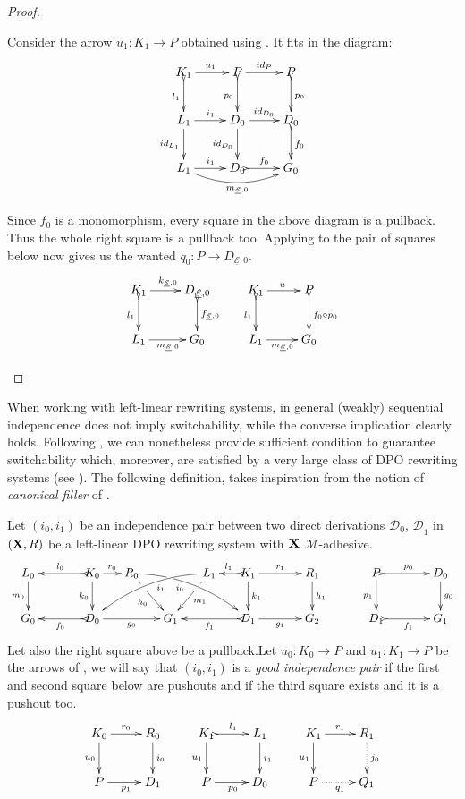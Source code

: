 \documentclass[a4paper,UKenglish,cleveref,pdftex, thm-restate,numberwithinsect]{lipics}
\newcommand{\id}[1]{\mathsf{id}_{#1}}
\def\R{\mathsf{R}}
\def\X{\textbf {\textup{X}}}
\newcommand{\dder}[1]{\mathscr{#1}}
\newcommand{\der}[1]{\underline{\dder{#1}}}
\begin{document}
\begin{proof}
	\begin{proofEnd}
		Consider the arrow $u_1\colon K_1\to P$ obtained using . It fits in the diagram:
		\[\xymatrix{K_1 \ar[r]^{u_1} \ar@{>->}[d]_{l_1}&P \ar[r]^{\id{P}}\ar@{>->}[d]_{p_0}& P\ar@{>->}[d]^{p_0}\\L_1  \ar[d]_{\id{L_1}}\ar[r]^{i_1}&D_0 \ar[r]^{\id{D_0}} \ar[d]_{\id{D_0}}& D_{0}  \ar@{>->}[d]^{f_0}\\ L_1\ar[r]^{i_1} \ar@/_.4cm/[rr]_{m_{\der{E},0}}&D_0 \ar@{>->}[r]^{f_0}&G_0}\]
		
		Since $f_0$ is a monomorphism, every square in the above diagram is a pullback. Thus the whole right square is a pullback too.
		Applying  to the pair of squares below now gives us the wanted $q_0\colon P\to D_{\der{E},0}$.
		\[\xymatrix{K_1 \ar@{>->}[d]_{l_1}\ar[r]^{k_{\der{E},0}}& D_{\der{E},0} \ar@{>->}[d]^{f_{\der{E},0}} & K_1 \ar[r]^{u} \ar@{>->}[d]_{l_1}& P \ar@{>->}[d]^{f_0\circ p_0}\\L_1\ar[r]_{m_{\der{E},0}}&G_0 &L_1 \ar[r]_{m_{\der{E},0}}&G_0}\]	
	\end{proofEnd} 	
\end{proof}




When working with left-linear rewriting systems, in general (weakly) sequential independence does not imply switchability, while the converse implication clearly holds. Following \cite{baldan2011adhesivity}, we can nonetheless provide sufficient condition to guarantee switchability which, moreover, are satisfied by a very large class of DPO rewriting systems (see ). The following definition, takes inspiration from the notion of \emph{canonical filler} of \cite{heindel2009category}.


\begin{definition}\label{def:filler}
	Let $(i_0, i_1)$ be an independence pair between two direct derivations $\dder{D}_0$, $\der{D}_1$ in $(\X, \R)$ be a left-linear DPO rewriting system with $\X$ $\mathcal{M}$-adhesive.
	\[\xymatrix@C=15pt{L_0 \ar[d]_{m_0}&& K_0 \ar[d]_{k_0}\ar@{>->}[ll]_{l_0} \ar[r]^{r_0} & R_0 \ar@/^.35cm/[drrr]|(.3)\hole_(.4){i_0} \ar[dr]|(.3)\hole_{h_0} && L_1 \ar@/_.35cm/[dlll]^(.4){i_1} \ar[dl]|(.3)\hole^{m_1}& K_1 \ar[d]^{k_1}\ar@{>->}[l]_{l_1} \ar[rr]^{r_1} && R_1 \ar[d]^{h_1} && P \ar@{>->}[rr]^{p_0} \ar[d]_{p_1}&& D_0\ar[d]^{g_0}\\G_0 && \ar@{>->}[ll]^{f_0} D_0 \ar[rr]_{g_0}&& G_1  && \ar@{>->}[ll]^{f_1} D_1 \ar[rr]_{g_1}&& G_2 &&  D_1 \ar@{>->}[rr]_{f_1} && G_1}\]
Let also the right square above be a pullback.Let $u_0\colon K_0\to P$ and $u_1\colon K_1\to P$ be the arrows of , we will say that $(i_0, i_1)$ is a \emph{good independence pair} if the first and second square below are pushouts and if the third square exists and it is a pushout too.
				\[\xymatrix{K_0 \ar[r]^{r_0}  \ar[d]_{u_0}& R_0 \ar[d]^{i_0} & K_1 \ar@{>->}[r]^{l_1}  \ar[d]_{u_1}& L_1 \ar[d]^{i_1}&K_1 \ar[r]^{r_1} \ar[d]_{u_1}& R_1\ar@{.>}[d]^{j_0} \\ P \ar[r]_{p_1} & D_1 &P \ar[r]_{p_0}  & D_0&P \ar@{.>}[r]_{q_1} & Q_1}\]
\end{definition}
\end{document}
